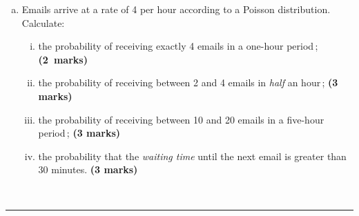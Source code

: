 \documentclass[12pt]{article}
\begin{document}
\begin{enumerate}[a)]
\item Emails arrive at a rate of 4 per hour according to a Poisson distribution.\\[0.3cm]
    Calculate:
    \begin{enumerate}[i)]\itemsep0.3cm
    \item the probability of receiving exactly 4 emails in a one-hour period\,; \phantom{aaa}\hfill{\mbox{\scriptsize \bf (2 marks)}}
    \item the probability of receiving between 2 and 4 emails in \emph{half} an hour\,; \phantom{a} \hfill{\scriptsize \bf (3 marks)}
    \item the probability of receiving between 10 and 20 emails in a five-hour period\,; \phantom{a} \hfill{\scriptsize \bf (3 marks)}
    \item the probability that the \emph{waiting time} until the next email is greater than 30 minutes. \hfill{\scriptsize \bf (3 marks)}
    \end{enumerate}
\end{enumerate}
\quad\\[-0.3cm]
\noindent\rule{\linewidth}{1pt}

\newpage
\end{document}
